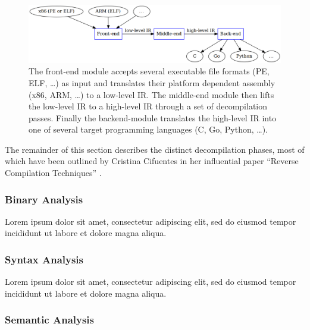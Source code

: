\documentclass[12pt, a4paper]{article}
\begin{document}
\begin{figure}[htbp]
	\includegraphics[width=\textwidth]{inc/modules_overview.png}
	\caption{The front-end module accepts several executable file formats (PE, ELF, …) as input and translates their platform dependent assembly (x86, ARM, …) to a low-level IR. The middle-end module then lifts the low-level IR to a high-level IR through a set of decompilation passes. Finally the backend-module translates the high-level IR into one of several target programming languages (C, Go, Python, …).}
	\label{modules_overview}
\end{figure}

The remainder of this section describes the distinct decompilation phases, most of which have been outlined by Cristina Cifuentes in her influential paper ``Reverse Compilation Techniques'' \cite{rev_comp}.


\subsubsection{Binary Analysis}

Lorem ipsum dolor sit amet, consectetur adipiscing elit, sed do eiusmod tempor incididunt ut labore et dolore magna aliqua.


\subsubsection{Syntax Analysis}

Lorem ipsum dolor sit amet, consectetur adipiscing elit, sed do eiusmod tempor incididunt ut labore et dolore magna aliqua.


\subsubsection{Semantic Analysis}
\end{document}
